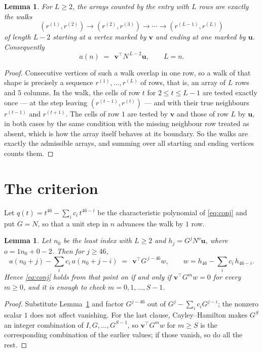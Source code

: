 \documentclass[11pt,a4paper]{article}
\theoremstyle{plain}
\newtheorem{lemma}[theorem]{Lemma}
\theoremstyle{definition}
\begin{document}
\begin{lemma}\label{lem:walk}
For $L\ge2$, the arrays counted by the entry with $L$ rows are exactly the walks
\[
(r^{(1)},r^{(2)})\to(r^{(2)},r^{(3)})\to\cdots\to(r^{(L-1)},r^{(L)})
\]
of length $L-2$ starting at a vertex marked by $\mathbf{v}$ and ending at one marked by
$\mathbf{u}$. Consequently
\[
a(n)\;=\;\,\mathbf{v}^{\!\top}N^{\,L-2}\mathbf{u},\qquad L=n .
\]
\end{lemma}

\begin{proof}
Consecutive vertices of such a walk overlap in one row, so a walk of that shape is
precisely a sequence $r^{(1)},\dots,r^{(L)}$ of rows, that is, an array of $L$ rows
and $5$ columns. In the walk, the cells of row $t$ for $2\le t\le L-1$ are tested
exactly once --- at the step leaving $(r^{(t-1)},r^{(t)})$ --- and with their true
neighbours $r^{(t-1)}$ and $r^{(t+1)}$. The cells of row $1$ are tested by
$\mathbf{v}$ and those of row $L$ by $\mathbf{u}$, in both cases by the same condition
with the missing neighbour row treated as absent, which is how the array itself behaves at
its boundary. So the walks are exactly the admissible arrays, and summing over all starting
and ending vertices counts them.
\end{proof}

\section{The criterion}

Let $q(t)=t^{46}-\sum_i c_i\,t^{46-i}$ be the characteristic polynomial of
\eqref{eq:conj} and put $G=N$, so that a unit step in $n$ advances the walk by
$1$ row.

\begin{lemma}\label{lem:crit}
Let $n_0$ be the least index with $L\ge2$ and $h_j=G^{j}N^{o}\mathbf{u}$, where
$o=1n_0+0-2$. Then for $j\ge46$,
\[
a(n_0+j)-\sum_i c_i\,a(n_0+j-i)\;=\;\,\mathbf{v}^{\!\top}G^{\,j-46}w,
\qquad w=h_{46}-\sum_i c_i\,h_{46-i} .
\]
Hence \eqref{eq:conj} holds from that point on if and only if
$\mathbf{v}^{\!\top}G^{m}w=0$ for every $m\ge0$, and it is enough to check
$m=0,1,\dots,S-1$.
\end{lemma}

\begin{proof}
Substitute Lemma~\ref{lem:walk} and factor $G^{j-46}$ out of
$G^{j}-\sum_ic_iG^{j-i}$; the nonzero scalar $1$ does not affect
vanishing. For the last clause, Cayley--Hamilton makes $G^{S}$ an integer combination of
$I,G,\dots,G^{S-1}$, so $\mathbf{v}^{\!\top}G^{m}w$ for $m\ge S$ is the corresponding
combination of the earlier values; if those vanish, so do all the rest.
\end{proof}
\end{document}
